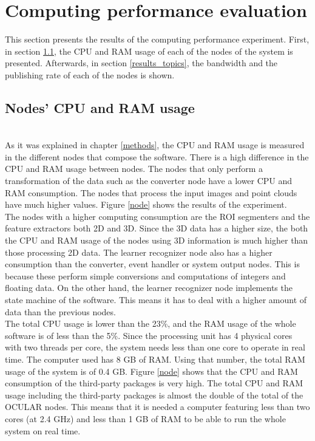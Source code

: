 \section{Computing performance evaluation}
This section presents the results of the computing performance experiment. 
First, in section \ref{results_nodes}, the CPU and RAM usage of each of the nodes of the system is presented. 
Afterwards, in section \ref{results_topics}, the bandwidth and the publishing rate of each of the nodes is shown. 
		\subsection{Nodes' CPU and RAM usage}
		\label{results_nodes}
		\\

			As it was explained in chapter \ref{methods}, the CPU and RAM usage is measured in the different nodes that compose the software. 
			There is a high difference in the CPU and RAM usage between nodes.
			The nodes that only perform a transformation of the data such as the converter node have a lower CPU and RAM consumption.
			The nodes that process the input images and point clouds have much higher values. 
			Figure \ref{node} shows the results of the experiment. 
\\

			The nodes with a higher computing consumption are the ROI segmenters and the feature extractors both 2D and 3D. 
			Since the 3D data has a higher size, the both the CPU and RAM usage of the nodes using 3D information is much higher than those processing 2D data. 
			The learner recognizer node also has a higher consumption than the converter, event handler or system output nodes. 
			This is because these perform simple conversions and computations of integers and floating data. 
			On the other hand, the learner recognizer node implements the state machine of the software. 
			This means it has to deal with a higher amount of data than the previous nodes. 
	\\

			The total CPU usage is lower than the 23\%, and the RAM usage of the whole software is of less than the 5\%. 
			Since the processing unit has 4 physical cores with two threads per core, the system needs less than one core to operate in real time. %
			The computer used has 8 GB of RAM. 
			Using that number, the total RAM usage of the system is of 0.4 GB. 
			Figure \ref{node} shows that the CPU and RAM consumption of the third-party packages is very high. 
			The total CPU and RAM usage including the third-party packages is almost the double of the total of the OCULAR nodes. 
			This means that it is needed a computer featuring less than two cores (at 2.4 GHz) and less than 1 GB of RAM to be able to run the whole system on real time. 

